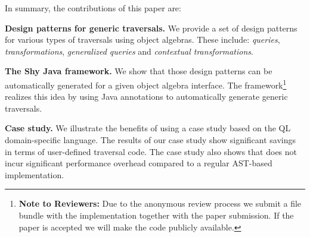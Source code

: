 In summary, the contributions of this paper are:

\begin{itemize*}

\item {\bf Design patterns for generic traversals.} We provide a set of design
patterns for various types of traversals using object algebras. These include:
\emph{queries}, \emph{transformations},
\emph{generalized queries} and \emph{contextual transformations}.

\item {\bf The Shy Java framework.} We show that those design patterns
  can be automatically generated for a given object algebra
  interface. The \name framework\footnote{{\bf
      Note to Reviewers:} Due to the anonymous review process we
    submit a file bundle with the implementation together with the paper submission. If the
    paper is accepted we will make the code publicly available.} realizes this idea by using
   Java annotations to automatically generate generic traversals.

\item {\bf Case study.} We illustrate the benefits of \name using a case study based on the QL domain-specific
  language. The results of our case study show significant savings in
  terms of user-defined traversal code. The case study also shows that \name does not incur significant performance overhead compared to a regular AST-based implementation.
\end{itemize*}
